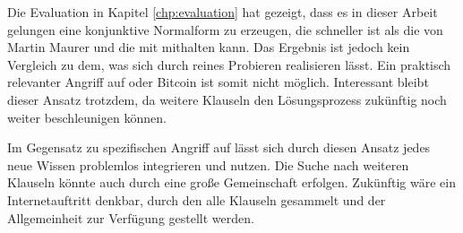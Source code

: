Die Evaluation in Kapitel \ref{chp:evaluation} hat gezeigt, dass es in dieser Arbeit gelungen eine konjunktive Normalform zu erzeugen, die schneller
ist als die von Martin Maurer und die mit  mithalten kann. Das Ergebnis ist jedoch kein Vergleich zu dem, was sich durch reines Probieren
realisieren lässt. Ein praktisch relevanter Angriff auf  oder Bitcoin ist somit nicht möglich. Interessant bleibt dieser Ansatz trotzdem,
da weitere Klauseln den Lösungsprozess zukünftig noch weiter beschleunigen können.

Im Gegensatz zu spezifischen Angriff auf  lässt sich durch diesen Ansatz jedes neue Wissen problemlos integrieren und nutzen.
Die Suche nach weiteren Klauseln könnte auch durch eine große Gemeinschaft erfolgen. Zukünftig wäre ein Internetauftritt denkbar, durch den
alle Klauseln gesammelt und der Allgemeinheit zur Verfügung gestellt werden.
